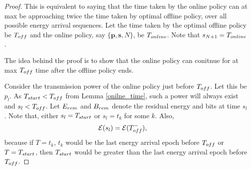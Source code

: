 \begin{proof}
This is equivalent to saying that the time taken by the online policy can at max be approaching twice the time taken by optimal offline policy, over all possible energy arrival sequences. Let the time taken by the optimal offline policy be $T_{\mbox{\scriptsize{off}}}$ and the online policy, say $\{\bm{{p}},\bm{{s}},{N}\}$, be $T_{\mbox{\scriptsize{online}}}$. Note that $s_{N+1}=T_{\mbox{\scriptsize{online}}}$. 

The idea behind the proof is to show that the online policy can conitnue for at max $T_{\mbox{\scriptsize{off}}}$ time  after the offline policy ends.
%

Consider the transmission power of the online policy just before $T_{\mbox{\scriptsize{off}}}$. Let this be ${p}_l$. As $T_{\mbox{\scriptsize{start}}}<T_{\mbox{\scriptsize{off}}}$ from Lemma \ref{onilne_time}, such a power will always exist and $s_l<T_{\mbox{\scriptsize{off}}}$. Let $E_{\mbox{\scriptsize{rem}}}$ and $B_{\mbox{\scriptsize{rem}}}$ denote the residual energy and bits at time ${s}_{l}$. Note that, either ${s}_{l}=T_{\mbox{\scriptsize{start}}}$ or ${s}_{l}=t_k$ for some $k$. Also, 
\begin{align}
&\ETx({s}_{l})=\ETx(T_{\mbox{\scriptsize{off}}}^-),
\label{eq_online_time_0}
\end{align}
because if $T=t_k$, $t_k$ would be the last energy arrival epoch before $T_{\mbox{\scriptsize{off}}}$ or $T=T_{\mbox{\scriptsize{start}}}$, then $T_{\mbox{\scriptsize{start}}}$ would be greater than the last energy arrival epoch before $T_{\mbox{\scriptsize{off}}}$. 


\end{proof}
